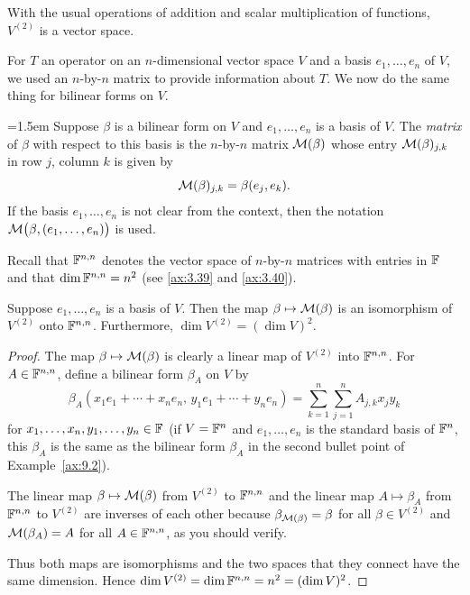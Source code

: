 With the usual operations of addition and scalar multiplication of functions,
$V^{(2)}$ is a vector space.

For $T$ an operator on an $n$-dimensional vector space $V$ and a basis
$e_1,\dots,e_n$ of $V$, we used an $n$-by-$n$ matrix to provide information
about $T$. We now do the same thing for bilinear forms on $V$.

\begin{definition}\label{ax:9.4}\emergencystretch=1.5em
Suppose $\beta$ is a bilinear form on $V$ and $e_1,\dots,e_n$ is a basis of
$V$. The \emph{matrix} of $\beta$ with respect to this basis is the $n$-by-$n$
matrix $\mathcal{M}(\beta)$ whose entry $\mathcal{M}(\beta)_{j,k}$ in row $j$, column $k$ is
given by
\[ \mathcal{M}(\beta)_{j,k} = \beta(e_j,e_k). \]
If the basis $e_1,\dots,e_n$ is not clear from the context, then the notation
$\mathcal{M}\bigl(\beta,\allowbreak(e_1,\dots,e_n)\bigr)$ is used.
\end{definition}

Recall that $\mathbb{F}^{n,n}$ denotes the vector space of $n$-by-$n$ matrices with
entries in $\mathbb{F}$ and that $\operatorname{dim}\mathbb{F}^{n,n}=n^2$ (see \ref{ax:3.39} and
\ref{ax:3.40}).

\begin{result}[$\dim V^{(2)}=(\dim V)^2$]\label{ax:9.5}
Suppose $e_1,\dots,e_n$ is a basis of $V$. Then the map
$\beta\mapsto\mathcal{M}(\beta)$ is an isomorphism of $V^{(2)}$ onto $\mathbb{F}^{n,n}$.
Furthermore, $\dim V^{(2)}=(\dim V)^2$.
\end{result}

\begin{proof}
The map $\beta\mapsto\mathcal{M}(\beta)$ is clearly a linear map of $V^{(2)}$ into
$\mathbb{F}^{n,n}$. For $A\in\mathbb{F}^{n,n}$, define a bilinear form $\beta_A$ on $V$ by
\[ \beta_A(x_1e_1+\cdots+x_ne_n,\,y_1e_1+\cdots+y_ne_n)
   = \sum_{k=1}^n\sum_{j=1}^n A_{j,k}x_jy_k \]
for $x_1,\dots,x_n,y_1,\dots,y_n\in\mathbb{F}$ (if $V=\mathbb{F}^n$ and $e_1,\dots,e_n$ is the
standard basis of $\mathbb{F}^n$, this $\beta_A$ is the same as the bilinear form
$\beta_A$ in the second bullet point of Example~\ref{ax:9.2}).

The linear map $\beta\mapsto\mathcal{M}(\beta)$ from $V^{(2)}$ to $\mathbb{F}^{n,n}$ and the
linear map $A\mapsto\beta_A$ from $\mathbb{F}^{n,n}$ to $V^{(2)}$ are inverses of each
other because $\beta_{\mathcal{M}(\beta)}=\beta$ for all $\beta\in V^{(2)}$ and
$\mathcal{M}(\beta_A)=A$ for all $A\in\mathbb{F}^{n,n}$, as you should verify.

Thus both maps are isomorphisms and the two spaces that they connect have the
same dimension. Hence $\operatorname{dim} V^{(2)}=\operatorname{dim}\mathbb{F}^{n,n}=n^2=(\operatorname{dim} V)^2$.
\end{proof}

